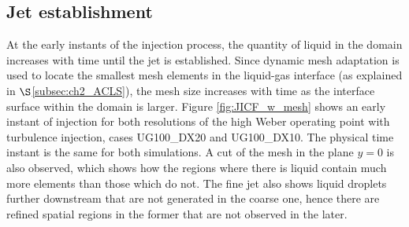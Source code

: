 %
%



\subsection{Jet establishment}

At the early instants of the injection process, the quantity of liquid in the domain increases with time until the jet is established. Since dynamic mesh adaptation is used to locate the smallest mesh elements in the liquid-gas interface (as explained in $\S$\ref{subsec:ch2_ACLS}), the mesh size increases with time as the interface surface within the domain is larger. Figure \ref{fig:JICF_w_mesh} shows an early instant of injection for both resolutions of the high Weber operating point with turbulence injection, cases UG100\_DX20 and UG100\_DX10. The physical time instant is the same for both simulations. A cut of the mesh in the plane $y = 0$ is also observed, which shows how the regions where there is liquid contain much more elements than those which do not. The fine jet also shows liquid droplets further downstream that are not generated in the coarse one, hence there are refined spatial regions in the former that are not observed in the later.




